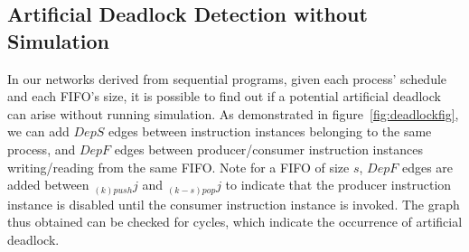 \subsection{Artificial Deadlock Detection without Simulation}
In our networks derived from sequential programs, given each process' schedule and each FIFO's size, it is possible
to find out if a potential artificial deadlock can arise without running simulation. As demonstrated in figure~\ref{fig:deadlockfig}, we can add $DepS$ edges between instruction instances belonging to the same process, and $DepF$ edges between
producer/consumer instruction instances writing/reading from the same FIFO.
Note for a FIFO of size $s$, $DepF$ edges are added between 
$_{(k)push}j$ and $_{(k-s)pop}j$ 
to indicate that the producer instruction instance is disabled
until the consumer instruction instance is invoked. The graph thus obtained
can be checked for cycles, which indicate the occurrence of artificial deadlock.


